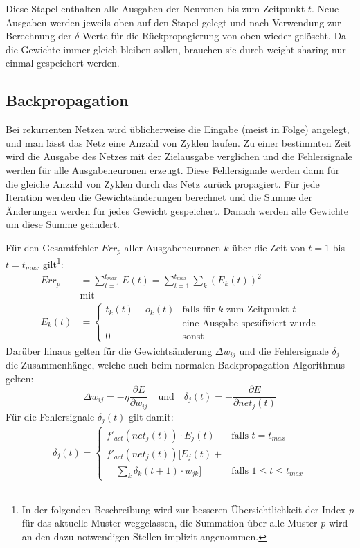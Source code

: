 Diese Stapel enthalten alle Ausgaben der Neuronen bis zum Zeitpunkt $t$. Neue Ausgaben werden jeweils oben auf den Stapel gelegt und nach Verwendung zur Berechnung der $\delta$-Werte für die Rückpropagierung von oben wieder gelöscht.
Da die Gewichte immer gleich bleiben sollen, brauchen sie durch weight sharing nur einmal gespeichert werden.


\subsection*{Backpropagation}
Bei rekurrenten Netzen wird üblicherweise die Eingabe (meist in Folge) angelegt, und man lässt das Netz eine Anzahl von Zyklen laufen. Zu einer bestimmten Zeit wird die Ausgabe des Netzes mit der Zielausgabe verglichen und die Fehlersignale werden für alle Ausgabeneuronen erzeugt.
Diese Fehlersignale werden dann für die gleiche Anzahl von Zyklen durch das Netz zurück propagiert. Für jede Iteration werden die Gewichtsänderungen berechnet und die Summe der Änderungen werden für jedes Gewicht gespeichert. Danach werden alle Gewichte um diese Summe geändert.

Für den Gesamtfehler $Err_p$ aller Ausgabeneuronen $k$ über die Zeit von $t=1$ bis $t=t_{max}$ gilt\footnote{In der folgenden Beschreibung wird zur besseren Übersichtlichkeit der Index $p$ für das aktuelle Muster weggelassen, die Summation über alle Muster $p$ wird an den dazu notwendigen Stellen implizit angenommen.}:
\begin{align*}
	Err_p &= \sum_{t=1}^{t_{max}} E(t)
		= \sum_{t=1}^{t_{max}} \sum_k ( E_k(t))^2 \\
	&\text{mit}\\
	E_k(t) &=
	\begin{cases}
		t_k(t) - o_k(t) &\text{falls für } k \text{ zum Zeitpunkt } t \\
			&\text{eine Ausgabe spezifiziert wurde} \\
		0	&\text{sonst}
	\end{cases}
\end{align*}
\noindent
Darüber hinaus gelten für die Gewichtsänderung $\Delta w_{ij}$ und die Fehlersignale $\delta_j$ die Zusammenhänge, welche auch beim normalen Backpropagation Algorithmus gelten:
\[
	\Delta w_{ij} = - \eta \frac{\partial E}{\partial w_{ij}}
	\quad \text{und} \quad
	\delta_j(t) = - \frac{\partial E}{\partial net_j(t)}
\]
\noindent
Für die Fehlersignale $\delta_j(t)$ gilt damit:
\begin{align*}
	\delta_j(t) = 
	\begin{cases}
		f'_{act}(net_j(t)) \cdot E_j(t) &\text{falls } t = t_{max} \\
		f'_{act}(net_j(t)) \big [ 
			E_j(t) + &\\
			\quad \sum_k \delta_k(t+1) \cdot w_{jk} \big ]
			&\text{falls } 1 \le t \le t_{max}
	\end{cases}
\end{align*}

